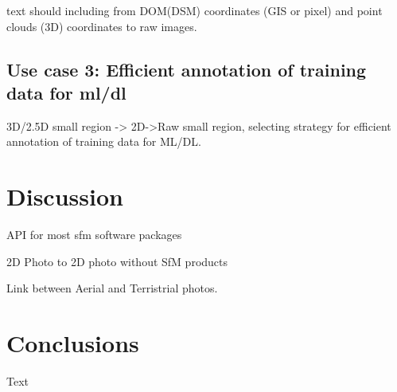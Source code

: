 \documentclass[sensors,article,submit,moreauthors, xelatex]{Definitions/mdpi}
\begin{document}
text \cite{ma_calculation_2019, guo_illumination_2013}
should including from DOM(DSM) coordinates (GIS or pixel) and point clouds (3D) coordinates to raw images.

\subsection{Use case 3: Efficient annotation of training data for \acrshort*{ml}/\acrshort*{dl}}
3D/2.5D small region -> 2D->Raw small region, selecting strategy for efficient annotation of training data for ML/DL.

\section{Discussion}

API for most \acrshort*{sfm} software packages

2D Photo to 2D photo without SfM products

Link between Aerial and Terristrial photos.

\section{Conclusions}
Text

\vspace{6pt} 

\end{document}
